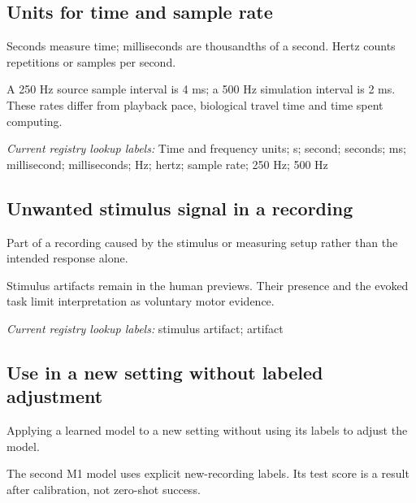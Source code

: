 \begin{samepage}
\subsection*{Units for time and sample rate}
\noindent Seconds measure time; milliseconds are thousandths of a second. Hertz counts repetitions or samples per second.\par
\end{samepage}
\begin{samepage}
\noindent A 250 Hz source sample interval is 4 ms; a 500 Hz simulation interval is 2 ms. These rates differ from playback pace, biological travel time and time spent computing.\par
\end{samepage}


\noindent\textit{Current registry lookup labels:} Time and frequency units; s; second; seconds; ms; millisecond; milliseconds; Hz; hertz; sample rate; 250 Hz; 500 Hz\par

\begin{samepage}
\subsection*{Unwanted stimulus signal in a recording}
\noindent Part of a recording caused by the stimulus or measuring setup rather than the intended response alone.\par
\end{samepage}
\begin{samepage}
\noindent Stimulus artifacts remain in the human previews. Their presence and the evoked task limit interpretation as voluntary motor evidence.\par\nopagebreak[4]

\end{samepage}


\noindent\textit{Current registry lookup labels:} stimulus artifact; artifact\par

\begin{samepage}
\subsection*{Use in a new setting without labeled adjustment}
\noindent Applying a learned model to a new setting without using its labels to adjust the model.\par
\end{samepage}
\begin{samepage}
\noindent The second M1 model uses explicit new-recording labels. Its test score is a result after calibration, not zero-shot success.\par\nopagebreak[4]

\end{samepage}


